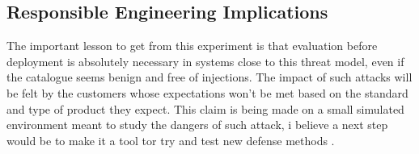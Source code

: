 \subsection{Responsible Engineering Implications}

The important lesson to get from this experiment is that evaluation before deployment is absolutely necessary in systems close to this threat model, even if the catalogue seems benign and free of injections. The impact of such attacks will be felt by the customers whose expectations won't be met based on the standard and type of product they expect. This claim is being made on a small simulated environment meant to study the dangers of such attack, i believe a next step would be to make it a tool tor try and test new defense methods \cite{ragpoisonlab_repo,harper2015movielens,perez2022redteaming,mazeika2024harmbench}.
